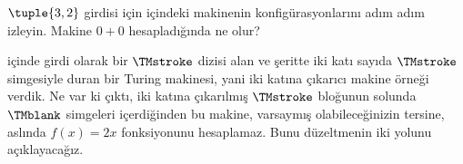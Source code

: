 \begin{prob}
$\tuple{3,2}$ girdisi için  içindeki makinenin
konfigürasyonlarını adım adım izleyin. Makine $0+0$ hesapladığında ne olur?
\end{prob}

\begin{explain}
 içinde girdi olarak bir $\TMstroke$ dizisi alan ve
şeritte iki katı sayıda $\TMstroke$ simgesiyle duran bir Turing makinesi,
yani iki katına çıkarıcı makine örneği verdik. Ne var ki çıktı, iki katına
çıkarılmış $\TMstroke$ bloğunun solunda $\TMblank$ simgeleri içerdiğinden
bu makine, varsaymış olabileceğinizin tersine, aslında $f(x)=2x$
fonksiyonunu hesaplamaz. Bunu düzeltmenin iki yolunu açıklayacağız.
\end{explain}

